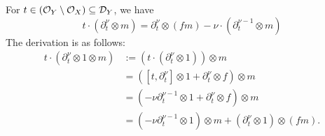 \begin{example}
\begin{enumerate}
              For $t\in (\mathcal{O}_Y\setminus\mathcal{O}_X) \subseteq \mathcal{D}_Y$, we have
              \[
                  t\cdot(\partial_t^\nu\otimes m) = \partial_t^\nu\otimes (fm) - \nu\cdot(\partial_t^{\nu-1}\otimes m)
              \]
              The derivation is as follows:
              \begin{align*}
                  t\cdot(\partial_t^\nu\otimes 1 \otimes m) & := (t\cdot (\partial_t^\nu\otimes 1))\otimes m                                        \\
                                                            & = ([t,\partial_t^\nu]\otimes 1 + \partial_t^\nu\otimes f)\otimes m                    \\
                                                            & = (-\nu\partial_t^{\nu-1}\otimes 1 + \partial_t^\nu\otimes f)\otimes m                \\
                                                            & = (-\nu\partial_t^{\nu-1}\otimes 1)\otimes m + (\partial_t^\nu\otimes 1)\otimes (fm).
              \end{align*}



\end{enumerate}
\end{example}
